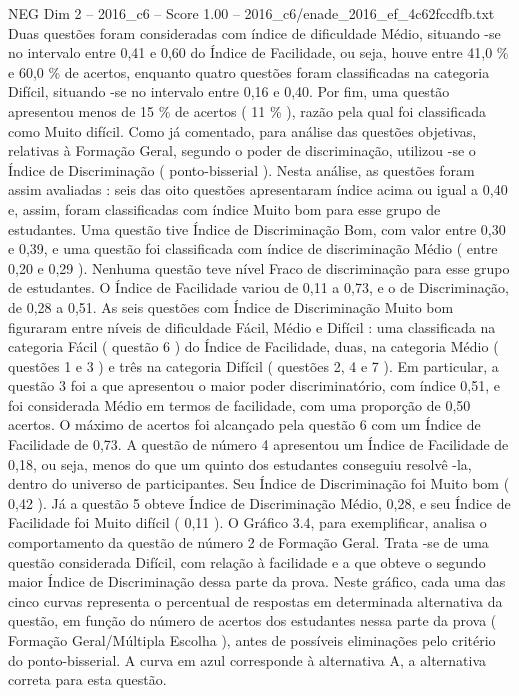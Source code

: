 \begin{textsample}{NEG Dim 2 – 2016\_c6 – Score 1.00 – 2016\_c6/enade\_2016\_ef\_4c62fccdfb.txt}
Duas questões foram consideradas com índice de dificuldade Médio, situando -se no intervalo entre 0,41 e 0,60 do Índice de Facilidade, ou seja, houve entre 41,0 \% e 60,0 \% de acertos, enquanto quatro questões foram classificadas na categoria Difícil, situando -se no intervalo entre 0,16 e 0,40.
Por fim, uma questão apresentou menos de 15 \% de acertos ( 11 \% ), razão pela qual foi classificada como Muito difícil.
Como já comentado, para análise das questões objetivas, relativas à Formação Geral, segundo o poder de discriminação, utilizou -se o Índice de Discriminação ( ponto-bisserial ).
Nesta análise, as questões foram assim avaliadas : seis das oito questões apresentaram índice acima ou igual a 0,40 e, assim, foram classificadas com índice Muito bom para esse grupo de estudantes.
Uma questão tive Índice de Discriminação Bom, com valor entre 0,30 e 0,39, e uma questão foi classificada com índice de discriminação Médio ( entre 0,20 e 0,29 ).
Nenhuma questão teve nível Fraco de discriminação para esse grupo de estudantes.
O Índice de Facilidade variou de 0,11 a 0,73, e o de Discriminação, de 0,28 a 0,51.
As seis questões com Índice de Discriminação Muito bom figuraram entre níveis de dificuldade Fácil, Médio e Difícil : uma classificada na categoria Fácil ( questão 6 ) do Índice de Facilidade, duas, na categoria Médio ( questões 1 e 3 ) e três na categoria Difícil ( questões 2, 4 e 7 ).
Em particular, a questão 3 foi a que apresentou o maior poder discriminatório, com índice 0,51, e foi considerada Médio em termos de facilidade, com uma proporção de 0,50 acertos.
O máximo de acertos foi alcançado pela questão 6 com um Índice de Facilidade de 0,73.
A questão de número 4 apresentou um Índice de Facilidade de 0,18, ou seja, menos do que um quinto dos estudantes conseguiu resolvê -la, dentro do universo de participantes.
Seu Índice de Discriminação foi Muito bom ( 0,42 ).
Já a questão 5 obteve Índice de Discriminação Médio, 0,28, e seu Índice de Facilidade foi Muito difícil ( 0,11 ).
O Gráfico 3.4, para exemplificar, analisa o comportamento da questão de número 2 de Formação Geral.
Trata -se de uma questão considerada Difícil, com relação à facilidade e a que obteve o segundo maior Índice de Discriminação dessa parte da prova.
Neste gráfico, cada uma das cinco curvas representa o percentual de respostas em determinada alternativa da questão, em função do número de acertos dos estudantes nessa parte da prova ( Formação Geral/Múltipla Escolha ), antes de possíveis eliminações pelo critério do ponto-bisserial.
A curva em azul corresponde à alternativa A, a alternativa correta para esta questão.

\end{textsample}
